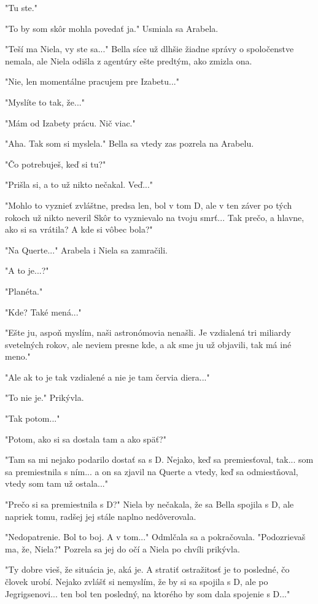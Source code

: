 \documentclass{book}
\begin{document}
"$ $Tu ste."$ $ 

"$ $To by som skôr mohla povedať ja."$ $  Usmiala sa Arabela.

"$ $Teší ma Niela, vy ste sa..."$ $  Bella síce už dlhšie žiadne správy o spoločenstve nemala, ale Niela odišla z agentúry ešte predtým, ako zmizla ona.

"$ $Nie, len momentálne pracujem pre Izabetu..."$ $ 

"$ $Myslíte to tak, že..."$ $ 

"$ $Mám od Izabety prácu. Nič viac."$ $ 

"$ $Aha. Tak som si myslela."$ $  Bella sa vtedy zas pozrela na Arabelu.

"$ $Čo potrebuješ, keď si tu?"$ $ 

"$ $Prišla si, a to už nikto nečakal. Veď..."$ $ 

"$ $Mohlo to vyznieť zvláštne, predsa len, bol v tom D, ale v ten záver po tých rokoch už nikto neveril Skôr to vyznievalo na tvoju smrť... Tak prečo, a hlavne, ako si sa vrátila? A kde si vôbec bola?"$ $ 

"$ $Na Querte..."$ $  Arabela i Niela sa zamračili.

"$ $A to je...?"$ $ 

"$ $Planéta."$ $ 

"$ $Kde? Také mená..."$ $ 

"$ $Ešte ju, aspoň myslím, naši astronómovia nenašli. Je vzdialená tri miliardy svetelných rokov, ale neviem presne kde, a ak sme ju už objavili, tak má iné meno."$ $ 

"$ $Ale ak to je tak vzdialené a nie je tam červia diera..."$ $ 

"$ $To nie je."$ $  Prikývla.

"$ $Tak potom..."$ $ 

"$ $Potom, ako si sa dostala tam a ako späť?"$ $ 

"$ $Tam sa mi nejako podarilo dostať sa s D. Nejako, keď sa premiesťoval, tak... som sa premiestnila s ním... a on sa zjavil na Querte a vtedy, keď sa odmiestňoval, vtedy som tam už ostala..."$ $ 

"$ $Prečo si sa premiestnila s D?"$ $  Niela by nečakala, že sa Bella spojila s D, ale napriek tomu, radšej jej stále naplno nedôverovala.

"$ $Nedopatrenie. Bol to boj. A v tom..."$ $  Odmlčala sa a pokračovala. "$ $Podozrievaš ma, že, Niela?"$ $  Pozrela sa jej do očí a Niela po chvíli prikývla.

"$ $Ty dobre vieš, že situácia je, aká je. A stratiť ostražitosť je to posledné, čo človek urobí. Nejako zvlášť si nemyslím, že by si sa spojila s D, ale po Jegrigsenovi... ten bol ten posledný, na ktorého by som dala spojenie s D..."$ $ 
\end{document}
